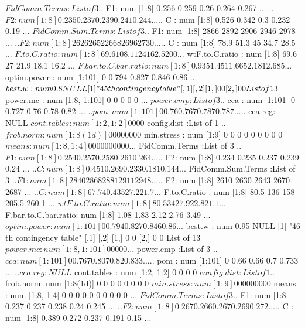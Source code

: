 \documentclass[11pt]{article} %
\begin{document}
\begin{Schunk}
\begin{Soutput}
 $ FidComm.Terms       :List of 3
  ..$ F1: num [1:8] 0.256 0.259 0.26 0.264 0.267 ...
  ..$ F2: num [1:8] 0.235 0.237 0.239 0.241 0.244 ...
  ..$ C : num [1:8] 0.526 0.342 0.3 0.232 0.19 ...
 $ FidComm.Sum.Terms   :List of 3
  ..$ F1: num [1:8] 2866 2892 2906 2946 2978 ...
  ..$ F2: num [1:8] 2626 2652 2668 2696 2730 ...
  ..$ C : num [1:8] 78.9 51.3 45 34.7 28.5 ...
 $ F.to.C.ratio        : num [1:8] 69.6 108.1 124 162.5 200 ...
 $ wtF.to.C.ratio      : num [1:8] 69.6 27 21.9 18.1 16.2 ...
 $ F.bar.to.C.bar.ratio: num [1:8] 0.935 1.451 1.665 2.181 2.685 ...
 $ optim.power         : num [1:101] 0 0.794 0.827 0.846 0.86 ...
 $ best.w              : num 0.8
NULL
[1] "45 th contingency table"
     [,1] [,2]
[1,]    0    0
[2,]    0    0
List of 13
 $ power.mc            : num [1:8, 1:101] 0 0 0 0 0 ...
 $ power.cmp           :List of 3
  ..$ cca    : num [1:101] 0 0.727 0.76 0.78 0.82 ...
  ..$ pom    : num [1:101] 0 0.76 0.767 0.787 0.787 ...
  ..$ cca.reg: NULL
 $ cont.tables         : num [1:2, 1:2] 0 0 0 0
 $ config.dist         :List of 1
  ..$ frob.norm: num [1:8(1d)] 0 0 0 0 0 0 0 0
 $ min.stress          : num [1:9] 0 0 0 0 0 0 0 0 0
 $ means               : num [1:8, 1:4] 0 0 0 0 0 0 0 0 0 0 ...
 $ FidComm.Terms       :List of 3
  ..$ F1: num [1:8] 0.254 0.257 0.258 0.261 0.264 ...
  ..$ F2: num [1:8] 0.234 0.235 0.237 0.239 0.24 ...
  ..$ C : num [1:8] 0.451 0.269 0.233 0.181 0.144 ...
 $ FidComm.Sum.Terms   :List of 3
  ..$ F1: num [1:8] 2840 2868 2881 2911 2948 ...
  ..$ F2: num [1:8] 2610 2630 2643 2670 2687 ...
  ..$ C : num [1:8] 67.7 40.4 35 27.2 21.7 ...
 $ F.to.C.ratio        : num [1:8] 80.5 136 158 205.5 260.1 ...
 $ wtF.to.C.ratio      : num [1:8] 80.5 34 27.9 22.8 21.1 ...
 $ F.bar.to.C.bar.ratio: num [1:8] 1.08 1.83 2.12 2.76 3.49 ...
 $ optim.power         : num [1:101] 0 0.794 0.827 0.846 0.86 ...
 $ best.w              : num 0.95
NULL
[1] "46 th contingency table"
     [,1] [,2]
[1,]    0    0
[2,]    0    0
List of 13
 $ power.mc            : num [1:8, 1:101] 0 0 0 0 0 ...
 $ power.cmp           :List of 3
  ..$ cca    : num [1:101] 0 0.767 0.807 0.82 0.833 ...
  ..$ pom    : num [1:101] 0 0.66 0.66 0.7 0.733 ...
  ..$ cca.reg: NULL
 $ cont.tables         : num [1:2, 1:2] 0 0 0 0
 $ config.dist         :List of 1
  ..$ frob.norm: num [1:8(1d)] 0 0 0 0 0 0 0 0
 $ min.stress          : num [1:9] 0 0 0 0 0 0 0 0 0
 $ means               : num [1:8, 1:4] 0 0 0 0 0 0 0 0 0 0 ...
 $ FidComm.Terms       :List of 3
  ..$ F1: num [1:8] 0.237 0.237 0.238 0.24 0.245 ...
  ..$ F2: num [1:8] 0.267 0.266 0.267 0.269 0.272 ...
  ..$ C : num [1:8] 0.389 0.272 0.237 0.191 0.15 ...

\end{Soutput}
\end{Schunk}
\end{document}
